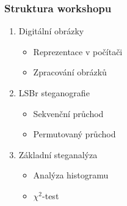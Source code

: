 \documentclass{beamer}
\begin{document}

\begin{frame}
\frametitle{Struktura workshopu}

\begin{enumerate}
\item Digitální obrázky
\begin{itemize}
\item Reprezentace v počítači
\item Zpracování obrázků
\end{itemize}
\item LSBr steganografie
\begin{itemize}
\item Sekvenční průchod
\item Permutovaný průchod
\end{itemize}
\item Základní steganalýza
\begin{itemize}
\item Analýza histogramu
\item $\chi^2$-test
\end{itemize}
\end{enumerate}
\end{frame}

\end{document}
